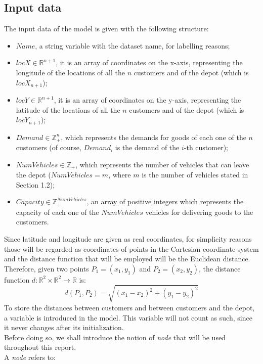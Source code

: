 \documentclass[../main.tex]{subfiles}
\begin{document}
\subsection{Input data}
The input data of the model is given with the following structure:
\begin{itemize}
    \item $Name$, a string variable with the dataset name, for labelling reasons;
    \item $locX \in \mathbb{R}^{n+1}$, it is an array of coordinates on the x-axis, representing the longitude of the locations of all the $n$ customers and of the depot (which is $locX_{n+1}$);
    \item $locY \in \mathbb{R}^{n+1}$, it is an array of coordinates on the y-axis, representing the latitude of the locations of all the $n$ customers and of the depot (which is $locY_{n+1}$);
    \item $Demand \in \mathbb{Z}_+^n$, which represents the demands for goods of each one of the $n$ customers (of course, $Demand_i$ is the demand of the $i$-th customer);
    \item $NumVehicles \in \mathbb{Z}_+$, which represents the number of vehicles that can leave the depot ($NumVehicles = m$, where $m$ is the number of vehicles stated in Section 1.2);
    \item $Capacity \in \mathbb{Z}_+^{NumVehicles}$, an array of positive integers which represents the capacity of each one of the $NumVehicles$ vehicles for delivering goods to the customers.
\end{itemize}
\noindent
Since latitude and longitude are given as real coordinates, for simplicity reasons those will be regarded as coordinates of points in the Cartesian coordinate system and the distance function that will be employed will be the Euclidean distance.\\
Therefore, given two points $P_1 = (x_1, y_1)$ and $P_2 = (x_2, y_2)$, the distance function $d: \mathbb{R}^2 \times \mathbb{R}^2 \rightarrow \mathbb{R}$ is: $$d(P_1, P_2) = \sqrt{(x_1 - x_2)^2+(y_1 - y_2)^2}$$
To store the distances between customers and between customers and the depot, a variable is introduced in the model. This variable will not count as such, since it never changes after its initialization.\\
Before doing so, we shall introduce the notion of \textit{node} that will be used throughout this report.\\
A \textit{node} refers to:
\end{document}
